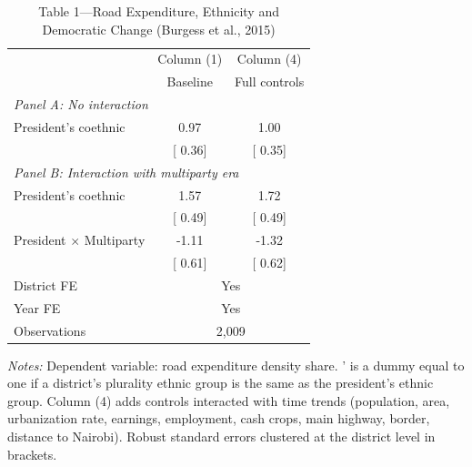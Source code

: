 \begin{table}[htbp]
\centering
\caption{Table 1---Road Expenditure, Ethnicity and Democratic Change (Burgess et al., 2015)}
\label{tab:burgess_table1}
\begin{tabular}{lcc}
\toprule
 & Column (1) & Column (4) \\
 & Baseline & Full controls \\
\midrule
\multicolumn{3}{l}{\textit{Panel A: No interaction}} \\[3pt]
President's coethnic &     0.97 &     1.00 \\
 & [    0.36] & [    0.35] \\[6pt]
\multicolumn{3}{l}{\textit{Panel B: Interaction with multiparty era}} \\[3pt]
President's coethnic &     1.57 &     1.72 \\
 & [    0.49] & [    0.49] \\
President $\times$ Multiparty &    -1.11 &    -1.32 \\
 & [    0.61] & [    0.62] \\[6pt]
\midrule
District FE & \multicolumn{2}{c}{Yes} \\
Year FE & \multicolumn{2}{c}{Yes} \\
Observations & \multicolumn{2}{c}{   2,009} \\
\bottomrule
\end{tabular}

\vspace{6pt}
\begin{minipage}{0.85\textwidth}
\footnotesize
\textit{Notes:} Dependent variable: road expenditure density share. 
' is a dummy equal to one if a district's 
plurality ethnic group is the same as the president's ethnic group. 
Column (4) adds controls interacted with time trends 
(population, area, urbanization rate, earnings, employment, cash crops, 
main highway, border, distance to Nairobi). 
Robust standard errors clustered at the district level in brackets.
\end{minipage}
\end{table}
